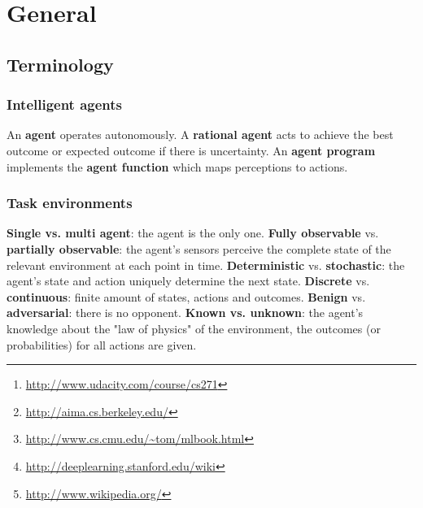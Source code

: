 \documentclass{report}
\begin{document}
\begin{abstract}
\begin{itemize}
\item Sebastian Thrun and Peter Norvig. {\em CS271 Intro to Artificial Intelligence}. Udacity.\footnote{\url{http://www.udacity.com/course/cs271}}
\item Stuart Russell and Peter Norvig. {\em Artificial Intelligence: A Modern Approach}. Third edition.\footnote{\url{http://aima.cs.berkeley.edu/}}
\item Tom Mitchell. {\em Machine Learning}. \footnote{\url{http://www.cs.cmu.edu/~tom/mlbook.html}}
\item {\em Unsupervised Feature Learning and Deep Learning}. Stanford University. \footnote{\url{http://deeplearning.stanford.edu/wiki}}
\item {\em Wikipedia}. Various articles.\footnote{\url{http://www.wikipedia.org/}}
\end{itemize}

With reference to the purpose of this document, it does not contain original research. Quite the opposite, various statements were copied directly from other sources.

~\\~\\~\\~\\
\begin{flushright}
Patrick GLAUNER
\end{flushright}

\end{abstract}


\chapter{General}
\section{Terminology}
\subsection{Intelligent agents}
An {\bf agent} operates autonomously. A {\bf rational agent} acts to achieve the best outcome or expected outcome if there is uncertainty. An {\bf agent program} implements the {\bf agent function} which maps perceptions to actions.

\subsection{Task environments}
{\bf Single vs. multi agent}: the agent is the only one. {\bf Fully observable} vs. {\bf partially observable}: the agent's sensors perceive the complete state of the relevant environment at each point in time. {\bf Deterministic} vs. {\bf stochastic}: the agent's state and action uniquely determine the next state. {\bf Discrete} vs. {\bf continuous}: finite amount of states, actions and outcomes. {\bf Benign} vs. {\bf adversarial}: there is no opponent. {\bf Known vs. unknown}: the agent's knowledge about the "law of physics" of the environment, the outcomes (or probabilities) for all actions are given.
\end{document}
